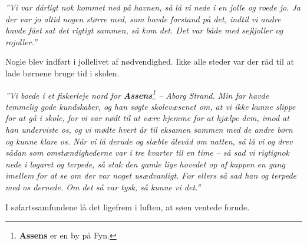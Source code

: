 \emph{''Vi var dårligt nok kommet ned på havnen, så lå vi nede i en
jolle og roede jo. Ja der var jo altid nogen større med, som havde
forstand på det, indtil vi andre havde fået sat det rigtigt sammen, så
kom det. Det var både med sejljoller og rojoller.''}

Nogle blev indført i jollelivet af nødvendighed. Ikke alle steder var
der råd til at lade børnene bruge tid i skolen.

\emph{''Vi boede i et fiskerleje nord for \textbf{Assens}\footnote{\textbf{Assens}
  er en by på Fyn.} -- Aborg Strand. Min far havde temmelig gode
kundskaber, og han søgte skolevæsenet om, at vi ikke kunne slippe for at
gå i skole, for vi var nødt til at være hjemme for at hjælpe dem, imod
at han underviste os, og vi mødte hvert år til eksamen sammen med de
andre børn og kunne klare os. Når vi lå derude og slæbte ålevåd om
natten, så lå vi og drev sådan som omstændighederne var i tre kvarter
til en time -- så sad vi rigtignok nede i logaret og terpede, så stak
den gamle lige hovedet op af kappen en gang imellem for at se om der var
noget usædvanligt. For ellers så sad han og terpede med os dernede. Om
det så var tysk, så kunne vi det.''}


I søfartssamfundene lå det ligefrem i luften, at søen ventede forude.

